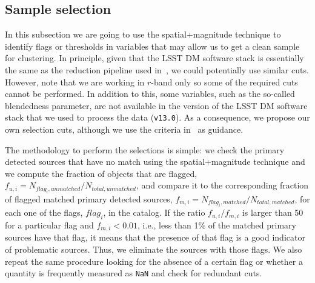 \documentclass[twocolumn]{aastex62}
\begin{document}
\subsection{Sample selection}
\label{ssec:sample_selection}

In this subsection we are going to use the spatial+magnitude technique to identify flags or thresholds in variables that may allow us to get a clean sample for clustering. In principle, given that the LSST DM software stack is essentially the same as the reduction pipeline used in~\citet{2018PASJ...70S..25M}, we could potentially use similar cuts. However, note that we are working in $r$-band only so some of the required cuts cannot be performed. In addition to this, some variables, such as the so-called blendedness parameter, are not available in the version of the LSST DM software stack that we used to process the data (\texttt{v13.0}). As a consequence, we propose our own selection cuts, although we use the criteria in~\citet{2018PASJ...70S..25M} as guidance.


The methodology to perform the selections is simple: we check the primary detected sources that have no match using the spatial+magnitude technique and we compute the fraction of objects that are flagged, $f_{u,i} = N_{flag_{i}, unmatched}/N_{total, unmatched}$, and compare it to the corresponding fraction of flagged matched primary detected sources, $f_{m,i} = N_{flag_{i}, matched}/N_{total, matched}$, for each one of the flags, $flag_{i}$, in the catalog. If the ratio $f_{u,i}/f_{m,i}$ is larger than 50 for a particular flag and $f_{m,i} < 0.01$, i.e., less than 1\% of the matched primary sources have that flag, it means that the presence of that flag is a good indicator of problematic sources. Thus, we eliminate the sources with those flags. We also repeat the same procedure looking for the absence of a certain flag or whether a quantity is frequently measured as \texttt{NaN} and check for redundant cuts. 
\end{document}
